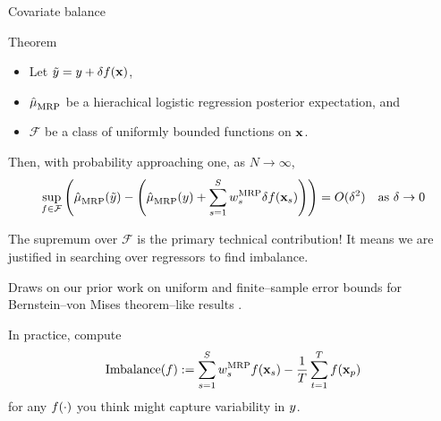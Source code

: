 
\begin{frame}[t]{Covariate balance}

\begin{block}{Theorem}
    \begin{itemize}
        \item Let $\tilde{y} = y + \delta f(\mathbf{x})$,
        \item $\hat{\mu}^{}_{\mathrm{MRP}}$ be a hierachical logistic regression posterior expectation, and
        \item $\mathcal{F}$ be a class of uniformly bounded functions on $\mathbf{x}$.
    \end{itemize}
    Then, with probability approaching one, as $N \rightarrow \infty$,
    $$
    \begin{aligned}
        \sup_{f \in \mathcal{F}} \left(
            \hat{\mu}^{}_{\mathrm{MRP}}(\tilde{y}) -
            \left(\hat{\mu}^{}_{\mathrm{MRP}}(y) + \sum_{s=1}^S w_s^{\mathrm{MRP}} \delta f(\mathbf{x}_s) \right)
            \right)
        = O(\delta^2)
        \quad\textrm{as }\delta \rightarrow 0
    \end{aligned}
    $$
\end{block}

The supremum over $\mathcal{F}$ is the primary technical contribution!
It means we are justified in searching over regressors
to find imbalance.

Draws on our prior work on uniform and finite--sample error bounds for Bernstein--von Mises
theorem--like results \citep{giordano:2024:bayesij,kasprzak:2025:laplace}.

In practice, compute
$$
\textrm{Imbalance}(f) := \sum_{s=1}^S w_s^{\mathrm{MRP}} f(\mathbf{x}_s)  - \frac{1}{T} \sum_{t=1}^T f(\mathbf{x}_p)
$$
for any $f(\cdot)$ you think might capture variability in $y$.

\end{frame}





